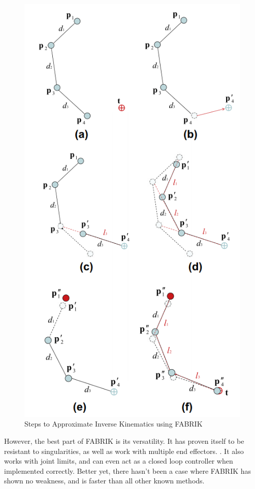 \begin{figure}[thbp]
    \centering
    \includegraphics[width=0.85\linewidth]{Figures/FABRIK.png}
    \caption{Steps to Approximate Inverse Kinematics using FABRIK \cite{fabrik2011}}
    \label{fig:FABRIKSteps}
\end{figure}

However, the best part of FABRIK is its versatility. It has proven itself to be resistant to singularities, as well as work with multiple end effectors. \cite{fabrik2011}. It also works with joint limits, and can even act as a closed loop controller when implemented correctly. Better yet, there hasn't been a case where FABRIK has shown no weakness, and is faster than all other known methods.

